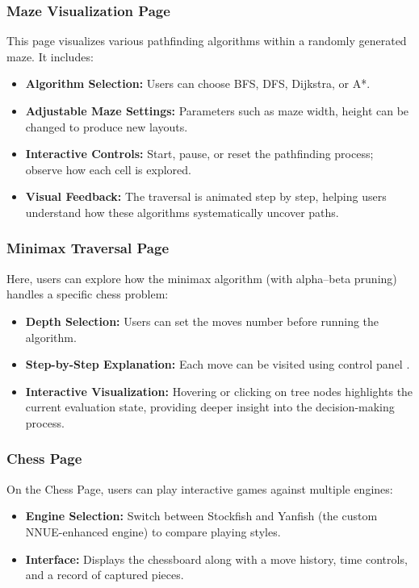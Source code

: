 \documentclass[12pt,a4paper]{article}
\begin{document}
\subsubsection{Maze Visualization Page}
This page visualizes various pathfinding algorithms within a randomly generated maze. It includes:
\begin{itemize}
  \item \textbf{Algorithm Selection:} Users can choose BFS, DFS, Dijkstra, or A*.
  \item \textbf{Adjustable Maze Settings:} Parameters such as maze width, height can be changed to produce new layouts.
  \item \textbf{Interactive Controls:} Start, pause, or reset the pathfinding process; observe how each cell is explored.
  \item \textbf{Visual Feedback:} The traversal is animated step by step, helping users understand how these algorithms systematically uncover paths.
\end{itemize}

\subsubsection{Minimax Traversal Page}
Here, users can explore how the minimax algorithm (with alpha--beta pruning) handles a specific chess problem:
\begin{itemize}
  \item \textbf{Depth Selection:} Users can set the moves number before running the algorithm.
  \item \textbf{Step-by-Step Explanation:} Each move can be visited using control panel .
  \item \textbf{Interactive Visualization:} Hovering or clicking on tree nodes highlights the current evaluation state, providing deeper insight into the decision-making process.
\end{itemize}

\subsubsection{Chess Page}
On the Chess Page, users can play interactive games against multiple engines:
\begin{itemize}
  \item \textbf{Engine Selection:} Switch between Stockfish and Yanfish (the custom NNUE-enhanced engine) to compare playing styles.
  \item \textbf{Interface:} Displays the chessboard along with a move history, time controls, and a record of captured pieces.
\end{itemize}
\end{document}
